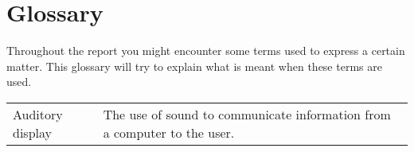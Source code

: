 
\section*{Glossary} %
\label{sec:glossary}

Throughout the report you might encounter some terms used to express a certain matter. 
This glossary will try to explain what is meant when these terms are used.

\begin{table}[!h]

\begin{tabular}{p{2in} p{3.4in}}
Auditory display & The use of sound to communicate information from a computer to the user.
\end{tabular}

\end{table}

